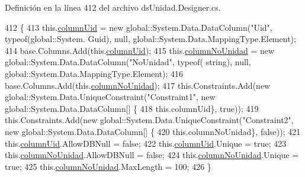 Definición en la línea 412 del archivo ds\-Unidad.\-Designer.\-cs.


\begin{DoxyCode}
412                                      \{
413                 this.\hyperlink{class_proyecto___integrador__3_1_1ds_unidad_1_1_unidad_data_table_aefd081eba99db8c2b29c1fa2f4c32245}{columnUid} = \textcolor{keyword}{new} global::System.Data.DataColumn(\textcolor{stringliteral}{"Uid"}, typeof(global::System.
      Guid), null, global::System.Data.MappingType.Element);
414                 base.Columns.Add(this.\hyperlink{class_proyecto___integrador__3_1_1ds_unidad_1_1_unidad_data_table_aefd081eba99db8c2b29c1fa2f4c32245}{columnUid});
415                 this.\hyperlink{class_proyecto___integrador__3_1_1ds_unidad_1_1_unidad_data_table_a76dea428dada0e0bc3dd85d44defca54}{columnNoUnidad} = \textcolor{keyword}{new} global::System.Data.DataColumn(\textcolor{stringliteral}{"NoUnidad"}, typeof(\textcolor{keywordtype}{
      string}), null, global::System.Data.MappingType.Element);
416                 base.Columns.Add(this.\hyperlink{class_proyecto___integrador__3_1_1ds_unidad_1_1_unidad_data_table_a76dea428dada0e0bc3dd85d44defca54}{columnNoUnidad});
417                 this.Constraints.Add(\textcolor{keyword}{new} global::System.Data.UniqueConstraint(\textcolor{stringliteral}{"Constraint1"}, \textcolor{keyword}{new} 
      global::System.Data.DataColumn[] \{
418                                 \textcolor{keyword}{this}.columnUid\}, \textcolor{keyword}{true}));
419                 this.Constraints.Add(\textcolor{keyword}{new} global::System.Data.UniqueConstraint(\textcolor{stringliteral}{"Constraint2"}, \textcolor{keyword}{new} 
      global::System.Data.DataColumn[] \{
420                                 \textcolor{keyword}{this}.columnNoUnidad\}, \textcolor{keyword}{false}));
421                 this.\hyperlink{class_proyecto___integrador__3_1_1ds_unidad_1_1_unidad_data_table_aefd081eba99db8c2b29c1fa2f4c32245}{columnUid}.AllowDBNull = \textcolor{keyword}{false};
422                 this.\hyperlink{class_proyecto___integrador__3_1_1ds_unidad_1_1_unidad_data_table_aefd081eba99db8c2b29c1fa2f4c32245}{columnUid}.Unique = \textcolor{keyword}{true};
423                 this.\hyperlink{class_proyecto___integrador__3_1_1ds_unidad_1_1_unidad_data_table_a76dea428dada0e0bc3dd85d44defca54}{columnNoUnidad}.AllowDBNull = \textcolor{keyword}{false};
424                 this.\hyperlink{class_proyecto___integrador__3_1_1ds_unidad_1_1_unidad_data_table_a76dea428dada0e0bc3dd85d44defca54}{columnNoUnidad}.Unique = \textcolor{keyword}{true};
425                 this.\hyperlink{class_proyecto___integrador__3_1_1ds_unidad_1_1_unidad_data_table_a76dea428dada0e0bc3dd85d44defca54}{columnNoUnidad}.MaxLength = 100;
426             \}
\end{DoxyCode}
